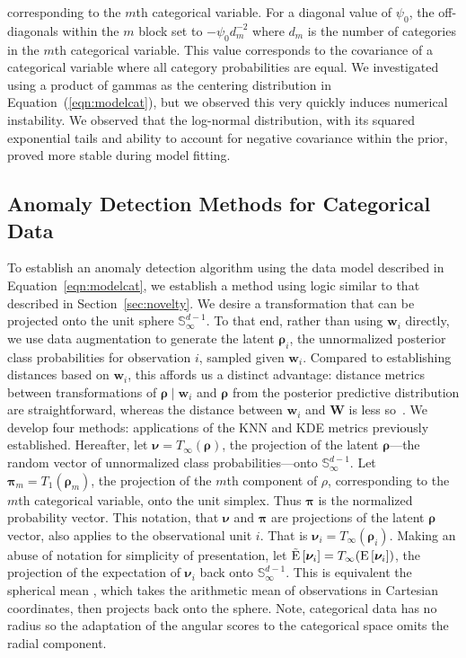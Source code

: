     corresponding to the $m$th categorical variable.  For a diagonal value of 
    $\psi_0$, the off-diagonals within the $m$ block set to $-\psi_0 d_m^{-2}$ 
    where $d_m$ is the number of categories in the $m$th categorical variable.
    This value corresponds to the covariance of a categorical variable where all 
    category probabilities are equal.
    We investigated using a product of gammas as the centering distribution in
    Equation~(\ref{eqn:modelcat}), but we observed this very quickly induces
    numerical instability.  We observed that the log-normal distribution, with
    its squared exponential tails and ability to account for negative covariance
    within the prior, proved more stable during model fitting.

\subsection{Anomaly Detection Methods for Categorical Data\label{subsec:catscores}}
To establish an anomaly detection algorithm using the data model described in 
    Equation~\ref{eqn:modelcat}, we establish a method using logic similar to 
    that described in Section~\ref{sec:novelty}.  We desire a transformation that 
    can be projected onto the unit sphere $\mathbb{S}_{\infty}^{d-1}$.  To that 
    end, rather than using $\bm{w}_i$ directly, we use data augmentation to 
    generate the latent $\bm{\rho}_i$, the unnormalized posterior class 
    probabilities for observation $i$, sampled given $\bm{w}_i$.  Compared to 
    establishing distances based on $\bm{w}_i$, this affords us a distinct 
    advantage: distance metrics between transformations of 
    $\bm{\rho}\mid\bm{w}_i$ and $\bm{\rho}$ from the posterior predictive 
    distribution are straightforward, whereas the distance between $\bm{w}_i$ 
    and $\bm{W}$ is less so~\citep{Alamuri2014}. We develop four methods: 
    applications of the KNN and KDE metrics previously established.  Hereafter, 
    let $\bm{\nu} = T_{\infty}\left(\bm{\rho}\right)$, the projection of the 
    latent $\bm{\rho}$---the random vector of unnormalized class 
    probabilities---onto $\mathbb{S}_{\infty}^{d-1}$.  Let 
    $\bm{\pi}_{m} = T_{1}(\bm{\rho}_m)$,
    the projection of the $m$th component of $\rho$, corresponding to the $m$th 
    categorical variable, onto the unit simplex. Thus $\bm{\pi}$ is the 
    normalized probability vector.  This notation, that $\bm{\nu}$ and 
    $\bm{\pi}$ are projections of the latent $\bm{\rho}$ vector, also applies 
    to the observational unit $i$.  That is 
    $\bm{\nu}_i = T_{\infty}(\bm{\rho}_i)$. Making an abuse of notation for 
    simplicity of presentation, let 
    $\tilde{\text{E}}\left[\bm{\nu}_i\right] = T_{\infty}(\text{E}\left[\bm{\nu}_i\right])$, 
    the projection of the expectation of $\bm{\nu}_i$ back onto 
    $\mathbb{S}_{\infty}^{d-1}$.  This is equivalent the spherical mean 
    \cite{mardia1999}, which takes the arithmetic mean of observations in 
    Cartesian coordinates, then projects back onto the sphere.  Note, 
    categorical data has no radius so the adaptation of the angular scores to 
    the categorical space omits the radial component.

